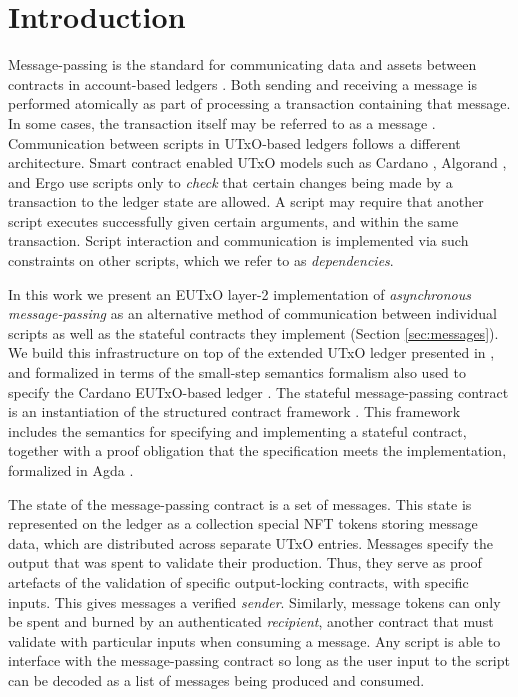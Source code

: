\section{Introduction}
\label{sec:intro}

Message-passing is the standard for communicating data and assets between contracts in
account-based ledgers \cite{ethereum} \cite{zilliqa} \cite{tezos}.
Both sending and receiving a message is performed atomically as part of processing a
transaction containing that message. In some cases, the transaction itself
may be referred to as a message \cite{tezos}.
Communication between scripts in UTxO-based ledgers follows a different architecture.
Smart contract enabled UTxO models such as Cardano \cite{alonzo}, Algorand \cite{algorand-docs},
and Ergo \cite{ergo} use scripts only to \emph{check} that certain changes being
made by a transaction to the ledger state are allowed. A
script may require that another script executes successfully given
certain arguments, and within the same transaction. Script interaction
and communication is implemented via such constraints on other scripts, which we refer to
as \emph{dependencies}.

In this work we present an EUTxO layer-2 implementation of \emph{asynchronous message-passing} as an
alternative method of communication between individual scripts
as well as the stateful contracts they implement (Section \ref{sec:messages}).
We build this infrastructure on top of the extended UTxO ledger presented in
\cite{eutxo}, and formalized in terms of the small-step semantics formalism \cite{steps}
also used to specify the Cardano EUTxO-based ledger \cite{alonzo}. The
stateful message-passing contract is an instantiation of the structured contract
framework \cite{structured}. This framework includes the semantics for specifying
and implementing a stateful contract, together with a proof obligation that
the specification meets the implementation, formalized in Agda \cite{agda-structured}.

The state of the message-passing contract is a set of messages. This state is represented
on the ledger as a collection special NFT tokens storing message data,
which are distributed across separate UTxO entries. Messages specify
the output that was spent to validate their production. Thus, they serve as proof
artefacts of the validation of specific output-locking contracts, with specific
inputs. This gives messages a verified \emph{sender}. Similarly,
message tokens can only be spent and burned by an authenticated \emph{recipient},
another contract that must validate with particular inputs when consuming a message.
Any script is able to interface
with the message-passing contract so long as the user input to the script can be
decoded as a list of messages being produced and consumed.


